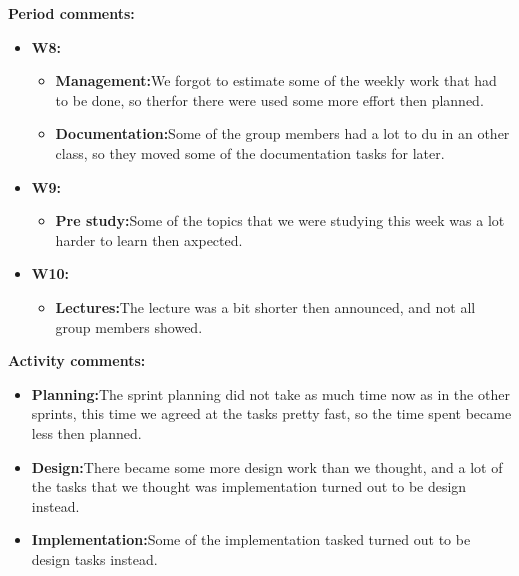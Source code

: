 \textbf{Period comments:}
\begin{itemize}
\item{}\textbf{W8:}
\begin{itemize}
\item{}\textbf{Management:}We forgot to estimate some of the weekly work that had to be done, so therfor there were used some more effort then planned.
\item{}\textbf{Documentation:}Some of the group members had a lot to du in an other class, so they moved some of the documentation tasks for later.
\end{itemize}
\item{}\textbf{W9:}
\begin{itemize}
\item{}\textbf{Pre study:}Some of the topics that we were studying this week was a lot harder to learn then axpected.
\end{itemize}
\item{}\textbf{W10:}
\begin{itemize}
\item{}\textbf{Lectures:}The lecture was a bit shorter then announced, and not all group members showed.
\end{itemize}
\end{itemize}

\newpage

\textbf{Activity comments:}
\begin{itemize}
\item{}\textbf{Planning:}The sprint planning did not take as much time now as in the other sprints, this time we agreed at the tasks pretty fast, so the time spent became less then planned.
\item{}\textbf{Design:}There became some more design work than we thought, and a lot of the tasks that we thought was implementation turned out to be design instead.
\item{}\textbf{Implementation:}Some of the implementation tasked turned out to be design tasks instead.
\end{itemize}